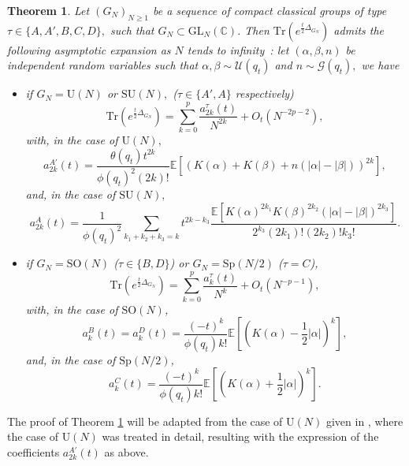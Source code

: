 \documentclass[11pt,a4paper,reqno]{article}
\newtheorem{theorem}{Theorem}[section]
\theoremstyle{definition}
\theoremstyle{remark}
\newcommand\SU{{\mathrm{SU}}}
\newcommand\SO{{\mathrm{SO}}}
\newcommand\Sp{{\mathrm{Sp}}}
\newcommand\GL{{\mathrm{GL}}}
\newcommand\U{{\mathrm U}}
\newcommand\C{\mathbb{C}}
\newcommand\Tr{\mathrm{Tr}}
\newcommand\Gfr{\mathscr{G}}
\newcommand\Ufr{\mathscr{U}}
\begin{document}
\begin{theorem}
 \label{thm:asympt_expansion_detailed}
 Let $(G_N)_{N \geq 1}$ be a sequence of compact classical groups of type $\tau \in \{A, A', B, C, D\},$ such that $G_N\subset\GL_N(\C)$. Then $\Tr(e^{\frac{t}{2}\Delta_{G_N}})$ admits the following asymptotic expansion as $N$ tends to infinity~: let $(\alpha, \beta,n)$ be independent random variables such that $\alpha, \beta \sim \Ufr(q_t)$ and $n \sim  \Gfr(q_t),$ we have
 \begin{itemize}
  \item if $G_N = \U(N)$ or $\SU(N),$ ($\tau \in \{A', A\}$ respectively)
  \[ \Tr(e^{\frac{t}{2}\Delta_{G_N}}) = \sum_{k=0}^p \frac{a_{2k}^\tau(t)}{N^{2k}} + O_t(N^{-2p-2}), \]
  with, in the case of $\U(N),$
  \[ a_{2k}^{A'}(t) = \frac{\theta(q_t) t^{2k}}{\phi(q_t)^2 (2k)!} \mathbb E\left[\left(K(\alpha) + K(\beta) +n (|\alpha|-|\beta|)\right)^{2k}\right], \]
  and, in the case of $\SU(N),$
   \[ a_{2k}^A(t) = \frac{1}{\phi(q_t)^2} \sum_{k_1+k_2+k_3 = k} t^{2k-k_3}\frac{\mathbb E\left[K(\alpha)^{2k_1} K(\beta)^{2k_2}(|\alpha|-|\beta|)^{2k_3}\right]}{2^{k_3}(2k_1)!(2k_2)!k_3!}. \]
 \item if $G_N = \SO(N)$ ($\tau \in\{B,D\}$) or $G_N=\Sp(N/2)$ ($\tau=C$),
\[ \Tr(e^{\frac{t}{2}\Delta_{G_N}}) = \sum_{k=0}^p \frac{a_{k}^\tau(t)}{N^{k}} + O_t(N^{-p-1}), \]
with, in the case of $\SO(N)$,
\[  a_{k}^{B}(t) = a_k^D(t)= \frac{(-t)^{k}}{\phi(q_t) k!} \mathbb E\left[\left(K(\alpha) - \frac 1 2 |\alpha|\right)^{k}\right],\]
and, in the case of $\Sp(N/2)$,
\[  a_{k}^{C}(t) = \frac{(-t)^{k}}{\phi(q_t) k!} \mathbb E\left[\left(K(\alpha) + \frac 1 2 |\alpha|\right)^{k}\right].\]
\end{itemize}
\end{theorem}

The proof of Theorem \ref{thm:asympt_expansion_detailed} will be adapted from the case of $\U(N)$ given in \cite{LM2}, where the case of  $\U(N)$ was treated in detail, resulting with the expression of the coefficients $a_{2k}^{A'}(t)$ as above.
\end{document}
